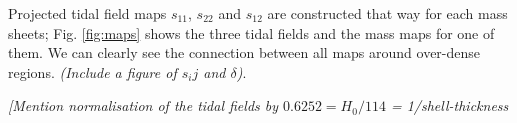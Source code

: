 \documentclass[useAMS,usenatbib]{mn2e}
\begin{document}

Projected tidal field maps $s_{11}$, $s_{22}$ and $s_{12}$ are constructed that way for each mass sheets; Fig. \ref{fig:maps} shows the  three tidal fields and the mass maps for one of them. We can clearly see the connection between all maps around over-dense regions. {\it (Include a figure of $s_ij$ and $\delta$)}. 

{\it [Mention normalisation of the tidal fields by $0.6252 = H_0/114$ = 1/shell-thickness}

\end{document}
